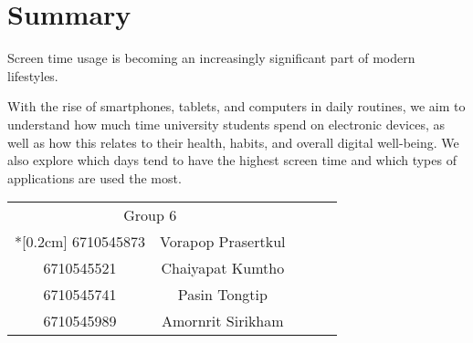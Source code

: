 \chapter*{Summary}
Screen time usage is becoming an increasingly significant part of modern lifestyles. \\
\par With the rise of smartphones, tablets, and computers in daily routines, we aim to understand how much time university students spend on electronic devices, as well as how this relates to their health, habits, and overall digital well-being. We also explore which days tend to have the highest screen time and which types of applications are used the most.
\begin{flushright}
    \begin{tabular}{cclll}
        \multicolumn{2}{c}{Group 6}     &  &  &  \\*[0.2cm]
        6710545873 & Vorapop Prasertkul &  &  &  \\
        6710545521 & Chaiyapat Kumtho   &  &  &  \\
        6710545741 & Pasin Tongtip      &  &  &  \\
        6710545989 & Amornrit Sirikham  &  &  & 
    \end{tabular}
\end{flushright}
